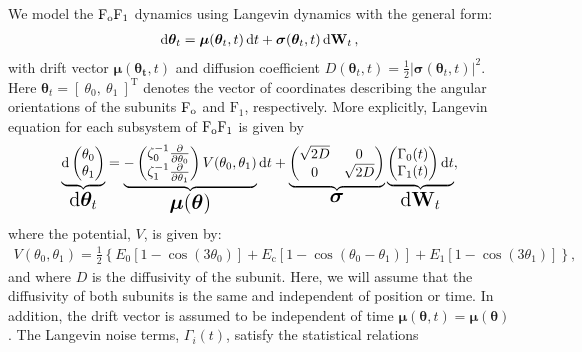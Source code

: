 \documentclass[10pt]{article}
\newcommand{\fo}{\mathrm{F}_{\rm o}}
\newcommand{\fI}{\mathrm{F}_{1}}
\newcommand{\fofI}{\mathrm{F}_{\rm o}\mathrm{F}_{1}}
\begin{document}
We model the $\fofI$ dynamics using Langevin dynamics with the general form:
\begin{align}
    \dd{\bm{\theta}_{t}} = \bm{\mu}(\bm{\theta}_{t},t)\dd{t} + \bm{\sigma}(\bm{\theta}_{t},t)\dd{\vb{W}_{t}},
\end{align}
with drift vector $\bm{\mu}(\bm{\theta_{t}},t)$ and diffusion coefficient $D(\bm{\theta}_{t},t) = \frac{1}{2}|\bm{\sigma}(\bm{\theta}_{t},t)|^{2}$. Here $\bm{\theta}_{t} = \left[\ \theta_{0},\ \theta_{1}\ \right]^{\mathrm{T}}$ denotes the vector of coordinates describing the angular orientations of the subunits $\fo$ and $\fI$, respectively. More explicitly, Langevin equation for each subsystem of $\fofI$ is given by
\begin{align}
    \underbrace{\mathrm{d}
        \begin{pmatrix}
        \theta_{0} \\ \theta_{1}
        \end{pmatrix}}_{\text{\Large $\dd{\bm{\theta}_{t}}$}} =
    \underbrace{-\begin{pmatrix}
        \zeta_{0}^{-1}\pdv{}{\theta_{0}}\\
        \zeta_{1}^{-1}\pdv{}{\theta_{1}}
        \end{pmatrix}V(\theta_{0},\theta_{1})}_{\text{\Large $\bm{\mu}(\bm{\theta})$}}
    \dd{t}
    +
    \underbrace{\begin{pmatrix}
        \sqrt{2D} & 0\\
        0 & \sqrt{2D}
        \end{pmatrix}}_{\text{\Large $\bm{\sigma}$}}
    \underbrace{\begin{pmatrix}
        \Gamma_{0}(t)\\
        \Gamma_{1}(t)
        \end{pmatrix}
        \dd{t}}_{\text{\Large $\dd{\vb{W}_{t}}$}},\label{eq:multidim_sde}
\end{align}
where the potential, $V$, is given by:
\begin{align}
    V(\theta_{0},\theta_{1}) = \frac{1}{2}\left\{E_{0}\left[1-\cos(3\theta_{0})\right]+E_{\mathrm{c}}\left[1-\cos(\theta_{0}-\theta_{1})\right] + E_{1}\left[1-\cos(3\theta_{1})\right]\right\},\label{eq:potential}
\end{align}
and where $D$ is the diffusivity of the subunit. Here, we will assume that the diffusivity of both subunits is the same and independent of position or time. In addition, the drift vector is assumed to be independent of time $\bm{\mu}(\bm{\theta},t) = \bm{\mu}(\bm{\theta})$. The Langevin noise terms, $\Gamma_{i}(t)$, satisfy the statistical relations
\end{document}
